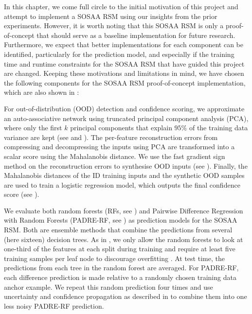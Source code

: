 \newpar In this chapter, we come full circle to the initial motivation of this project and attempt to implement a SOSAA RSM using our insights from the prior experiments. However, it is worth noting that this SOSAA RSM is only a proof-of-concept that should serve as a baseline implementation for future research. Furthermore, we expect that better implementations for each component can be identified, particularly for the prediction model, and especially if the training time and runtime constraints for the SOSAA RSM that have guided this project are changed. Keeping these motivations and limitations in mind, we have chosen the following components for the SOSAA RSM proof-of-concept implementation, which are also shown in :

For out-of-distribution (OOD) detection and confidence scoring, we approximate an auto-associative network using truncated principal component analysis (PCA), where only the first $k$ principal components that explain $95\%$ of the training data variance are kept (see  and ). The per-feature reconstruction errors from compressing and decompressing the inputs using PCA are transformed into a scalar score using the Mahalanobis distance. We use the fast gradient sign method on the reconstruction errors to synthesise OOD inputs (see ). Finally, the Mahalanobis distances of the ID training inputs and the synthetic OOD samples are used to train a logistic regression model, which outputs the final confidence score (see ).

We evaluate both random forests (RFs, see ) and Pairwise Difference Regression with Random Forests (PADRE-RF, see ) as prediction models for the SOSAA RSM. Both are ensemble methods that combine the predictions from several (here sixteen) decision trees. As in , we only allow the random forests to look at one-third of the features at each split during training and require at least five training samples per leaf node to discourage overfitting \cite{statistical-learning-2009}. At test time, the predictions from each tree in the random forest are averaged. For PADRE-RF, each difference prediction is made relative to a randomly chosen training data anchor example. We repeat this random prediction four times and use uncertainty and confidence propagation as described in  to combine them into one less noisy PADRE-RF prediction.

